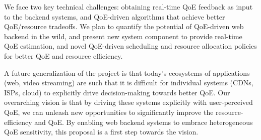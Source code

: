 We face two key technical challenges: obtaining real-time QoE feedback as input to the backend systems, and QoE-driven algorithms that achieve better QoE/resource tradeoffs.
We plan to quantify the potential of QoE-driven web backend in the wild, and present new system component to provide real-time QoE estimation, and novel QoE-driven scheduling and resource allocation policies for better QoE and resource efficiency.

A future generalization of the project is that today's ecosystems of applications (\eg web, video streaming) are such that it is difficult for individual systems (\eg CDNs, ISPs, cloud) to explicitly drive decision-making towards better QoE. 
Our overarching vision is that by driving these systems explicitly with user-perceived QoE, we can unleash new opportunities to significantly improve the resource-efficiency and QoE.
By enabling web backend systems to embrace heterogeneous QoE sensitivity, this proposal is a first step towards the vision. 




